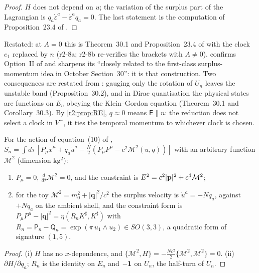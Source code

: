 \begin{proof}
$H$ does not depend on $u$; the variation of the surplus part of the Lagrangian is $q_a\dot\varepsilon^a-\dot\varepsilon^aq_a=0$. The last statement is the
computation of Proposition~23.4 of \cite{ES17}.
\end{proof}

Restated: at $A=0$ this is Theorem~30.1 and Proposition~23.4 of \cite{ES17} with the clock $e_1$ replaced by $n$ (r2-8a; r2-8b re-verifies the brackets with
$A\neq0$).  confirms Option~II of \cite{FMB} and sharpens its ``closely related to the first-class surplus-momentum idea in October
Section~30'': it is that construction. Two consequences are restated from \cite{ES17}: gauging only the rotation of $U_n$ leaves the unstable band
(Proposition~30.2), and in Dirac quantisation the physical states are functions on $E_n$ obeying the Klein--Gordon equation (Theorem~30.1 and Corollary~30.3). By
\cref{r2:prop:RE}, $q\approx0$ means $\boldsymbol{\mathsf E}\parallel n$: the reduction does not select a clock in $V^+$, it ties the temporal momentum
to whichever clock is chosen.

\begin{proposition}
\label{r2:prop:shellIII}
For the action of equation~(10) of \cite{FMB}, $S_n=\int d\tau\,[P_\mu\dot x^\mu+q_a\dot u^a-\tfrac N2(P_\mu P^\mu-c^2\mathcal M^2(u,q))]$ with an arbitrary
function $\mathcal M^2$ (dimension $\mathrm{kg^2}$):
\begin{enumerate}[label=(\roman*),leftmargin=2.2em]
\item $\dot P_\mu=0$, $\tfrac{d}{d\tau}\mathcal M^2=0$, and the constraint is $E^2=c^2|\mathbf p|^2+c^4\mathcal M^2$;
\item for the toy $\mathcal M^2=m_0^2+|\mathbf q|^2/c^2$ the surplus velocity is $\dot u^a=-Nq_a$, against $+Nq_a$ on the ambient shell, and the constraint
form is $P_\mu P^\mu-|\mathbf q|^2=\eta(R_nK^\sharp,K^\sharp)$ with $R_n=\mathsf P_n-\mathsf Q_n=\exp(\pi\,u_1\wedge u_2)\in SO(3,3)$, a quadratic form of
signature $(1,5)$.
\end{enumerate}
\end{proposition}

\begin{proof}
(i) $H$ has no $x$-dependence, and $\{\mathcal M^2,H\}=-\tfrac{Nc^2}2\{\mathcal M^2,\mathcal M^2\}=0$. (ii) $\partial H/\partial q_a$; $R_n$ is the
identity on $E_n$ and $-\mathbf 1$ on $U_n$, the half-turn of $U_n$.
\end{proof}

